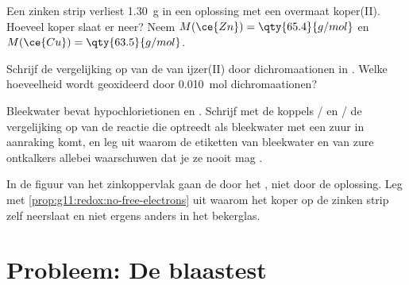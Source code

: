 \begin{exercise}[$\star\star\star$]\label{exo:g11:redox:12}
Een zinken strip verliest \qty{1.30}{g} in een oplossing met een overmaat
koper(II). Hoeveel koper slaat er neer? Neem
$M(\ce{Zn}) = \qty{65.4}{g/mol}$ en $M(\ce{Cu}) = \qty{63.5}{g/mol}$.
\end{exercise}

\begin{exercise}[$\star\star\star$]\label{exo:g11:redox:13}
Schrijf de vergelijking op van de  van ijzer(II) door
dichromaationen in . Welke hoeveelheid  wordt
geoxideerd door \qty{0.010}{mol} dichromaationen?
\end{exercise}

\begin{exercise}[$\star\star\star$]\label{exo:g11:redox:14}
Bleekwater bevat hypochlorietionen  en 
. Schrijf met de koppels / en /
de vergelijking op van de reactie die optreedt als bleekwater met een
zuur in aanraking komt, en leg uit waarom de etiketten van bleekwater en
van zure ontkalkers allebei waarschuwen dat je ze nooit mag .
\end{exercise}

\begin{exercise}[$\star\star\star$]\label{exo:g11:redox:15}
In de figuur van het zinkoppervlak gaan de  door het ,
niet door de oplossing. Leg met \cref{prop:g11:redox:no-free-electrons}
uit waarom het koper op de zinken strip zelf neerslaat en niet ergens
anders in het bekerglas.
\end{exercise}

\section{Probleem: De blaastest}


